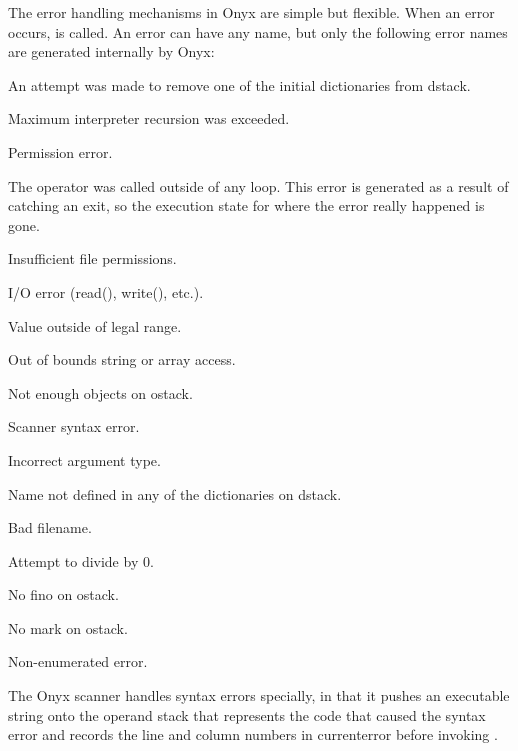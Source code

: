 The error handling mechanisms in Onyx are simple but flexible.  When an error
occurs,  is called.  An error can
have any name, but only the following error names are generated internally by
Onyx:
\begin{description}
\label{dstackunderflow}
\item[dstackunderflow: ] An attempt was made to remove one of the initial
dictionaries from dstack.
\label{estackoverflow}
\item[estackoverflow: ] Maximum interpreter recursion was exceeded.
\label{invalidaccess}
\item[invalidaccess: ] Permission error.
\label{invalidexit}
\item[invalidexit: ] The  operator was called outside of any
loop.  This error is generated as a result of catching an exit, so the execution
state for where the error really happened is gone.
\label{invalidfileaccess}
\item[invalidfileaccess: ] Insufficient file permissions.
\label{ioerror}
\item[ioerror: ] I/O error (read(), write(), etc.).
\label{limitcheck}
\item[limitcheck: ] Value outside of legal range.
\label{rangecheck}
\item[rangecheck: ] Out of bounds string or array access.
\label{stackunderflow}
\item[stackunderflow: ] Not enough objects on ostack.
\label{syntaxerror}
\item[syntaxerror: ] Scanner syntax error.
\label{typecheck}
\item[typecheck: ] Incorrect argument type.
\label{undefined}
\item[undefined: ] Name not defined in any of the dictionaries on dstack.
\label{undefinedfilename}
\item[undefinedfilename: ] Bad filename.
\label{undefinedresult}
\item[undefinedresult: ] Attempt to divide by 0.
\label{unmatchedfino}
\item[unmatchedfino: ] No fino on ostack.
\label{unmatchedmark}
\item[unmatchedmark: ] No mark on ostack.
\label{unregistered}
\item[unregistered: ] Non-enumerated error.
\end{description}

The Onyx scanner handles syntax errors specially, in that it pushes an
executable string onto the operand stack that represents the code that caused
the syntax error and records the line and column numbers in currenterror before
invoking .

